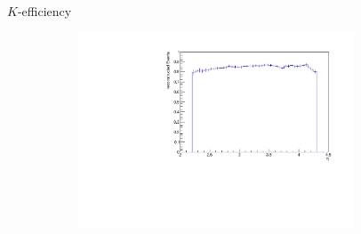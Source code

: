 \documentclass[11pt]{beamer}
\begin{document}
\begin{frame}{$K$-efficiency}
\begin{figure}
\begin{subfigure}{0.45\textwidth}
\end{subfigure}
\begin{subfigure}{0.45\textwidth}
\includegraphics[width=0.9\textwidth]{up_pdf/pos/h_eta_reco_K_pos.pdf}
\end{subfigure}
\end{figure}
\end{frame}
\end{document}
